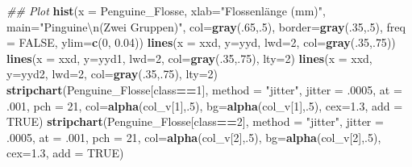 \documentclass[
  ngerman,
]{book}
\newenvironment{Shaded}{\begin{snugshade}}{\end{snugshade}}
\newcommand{\CharTok}[1]{\textcolor[rgb]{0.31,0.60,0.02}{#1}}
\newcommand{\CommentTok}[1]{\textcolor[rgb]{0.56,0.35,0.01}{\textit{#1}}}
\newcommand{\DataTypeTok}[1]{\textcolor[rgb]{0.13,0.29,0.53}{#1}}
\newcommand{\DecValTok}[1]{\textcolor[rgb]{0.00,0.00,0.81}{#1}}
\newcommand{\FloatTok}[1]{\textcolor[rgb]{0.00,0.00,0.81}{#1}}
\newcommand{\KeywordTok}[1]{\textcolor[rgb]{0.13,0.29,0.53}{\textbf{#1}}}
\newcommand{\NormalTok}[1]{#1}
\newcommand{\OperatorTok}[1]{\textcolor[rgb]{0.81,0.36,0.00}{\textbf{#1}}}
\newcommand{\OtherTok}[1]{\textcolor[rgb]{0.56,0.35,0.01}{#1}}
\newcommand{\StringTok}[1]{\textcolor[rgb]{0.31,0.60,0.02}{#1}}
\begin{document}
\begin{Shaded}
\begin{Highlighting}[]
\CommentTok{## Plot}
\KeywordTok{hist}\NormalTok{(}\DataTypeTok{x =}\NormalTok{ Penguine_Flosse, }\DataTypeTok{xlab=}\StringTok{"Flossenlänge (mm)"}\NormalTok{, }\DataTypeTok{main=}\StringTok{"Pinguine}\CharTok{\textbackslash{}n}\StringTok{(Zwei Gruppen)"}\NormalTok{,}
     \DataTypeTok{col=}\KeywordTok{gray}\NormalTok{(.}\DecValTok{65}\NormalTok{,.}\DecValTok{5}\NormalTok{), }\DataTypeTok{border=}\KeywordTok{gray}\NormalTok{(.}\DecValTok{35}\NormalTok{,.}\DecValTok{5}\NormalTok{), }\DataTypeTok{freq =} \OtherTok{FALSE}\NormalTok{, }\DataTypeTok{ylim=}\KeywordTok{c}\NormalTok{(}\DecValTok{0}\NormalTok{, }\FloatTok{0.04}\NormalTok{))}
\KeywordTok{lines}\NormalTok{(}\DataTypeTok{x =}\NormalTok{ xxd, }\DataTypeTok{y=}\NormalTok{yyd, }\DataTypeTok{lwd=}\DecValTok{2}\NormalTok{, }\DataTypeTok{col=}\KeywordTok{gray}\NormalTok{(.}\DecValTok{35}\NormalTok{,.}\DecValTok{75}\NormalTok{))}
\KeywordTok{lines}\NormalTok{(}\DataTypeTok{x =}\NormalTok{ xxd, }\DataTypeTok{y=}\NormalTok{yyd1, }\DataTypeTok{lwd=}\DecValTok{2}\NormalTok{, }\DataTypeTok{col=}\KeywordTok{gray}\NormalTok{(.}\DecValTok{35}\NormalTok{,.}\DecValTok{75}\NormalTok{), }\DataTypeTok{lty=}\DecValTok{2}\NormalTok{)}
\KeywordTok{lines}\NormalTok{(}\DataTypeTok{x =}\NormalTok{ xxd, }\DataTypeTok{y=}\NormalTok{yyd2, }\DataTypeTok{lwd=}\DecValTok{2}\NormalTok{, }\DataTypeTok{col=}\KeywordTok{gray}\NormalTok{(.}\DecValTok{35}\NormalTok{,.}\DecValTok{75}\NormalTok{), }\DataTypeTok{lty=}\DecValTok{2}\NormalTok{)}
\KeywordTok{stripchart}\NormalTok{(Penguine_Flosse[class}\OperatorTok{==}\DecValTok{1}\NormalTok{], }\DataTypeTok{method =} \StringTok{"jitter"}\NormalTok{, }\DataTypeTok{jitter =} \FloatTok{.0005}\NormalTok{, }\DataTypeTok{at =} \FloatTok{.001}\NormalTok{,}
           \DataTypeTok{pch =} \DecValTok{21}\NormalTok{, }\DataTypeTok{col=}\KeywordTok{alpha}\NormalTok{(col_v[}\DecValTok{1}\NormalTok{],.}\DecValTok{5}\NormalTok{), }\DataTypeTok{bg=}\KeywordTok{alpha}\NormalTok{(col_v[}\DecValTok{1}\NormalTok{],.}\DecValTok{5}\NormalTok{), }\DataTypeTok{cex=}\FloatTok{1.3}\NormalTok{, }\DataTypeTok{add =} \OtherTok{TRUE}\NormalTok{)}
\KeywordTok{stripchart}\NormalTok{(Penguine_Flosse[class}\OperatorTok{==}\DecValTok{2}\NormalTok{], }\DataTypeTok{method =} \StringTok{"jitter"}\NormalTok{, }\DataTypeTok{jitter =} \FloatTok{.0005}\NormalTok{, }\DataTypeTok{at =} \FloatTok{.001}\NormalTok{,}
           \DataTypeTok{pch =} \DecValTok{21}\NormalTok{, }\DataTypeTok{col=}\KeywordTok{alpha}\NormalTok{(col_v[}\DecValTok{2}\NormalTok{],.}\DecValTok{5}\NormalTok{), }\DataTypeTok{bg=}\KeywordTok{alpha}\NormalTok{(col_v[}\DecValTok{2}\NormalTok{],.}\DecValTok{5}\NormalTok{), }\DataTypeTok{cex=}\FloatTok{1.3}\NormalTok{, }\DataTypeTok{add =} \OtherTok{TRUE}\NormalTok{)}
\end{Highlighting}
\end{Shaded}
\end{document}
